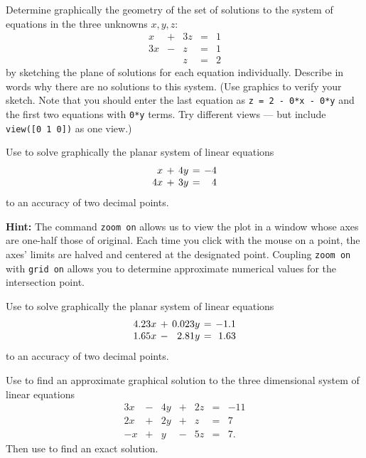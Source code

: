 \documentclass{ximera}
\begin{document}
\CEXER

\begin{exercise} \label{c2.2.10}
Determine graphically the geometry of the set of solutions to the
system of equations in the three unknowns $x,y,z$:
\[
\begin{array}{rcrcr}
  x & + & 3z  & = & 1\\
 3x & - &  z  & = & 1\\
    &   &  z  & = & 2
\end{array}
\]
by sketching the plane of solutions for each equation individually.
Describe in words why there are no solutions to this system.
(Use \Matlab graphics to verify your sketch.  Note that you should
enter the last equation as {\tt z = 2 - 0*x - 0*y} and the first two
equations with {\tt 0*y} terms.  Try different views --- but include
{\tt view([0 1 0])} as one view.)
\end{exercise}

\begin{exercise} \label{c2.2.1}
Use \Matlab to solve graphically the planar system of linear
equations
\[
\arraycolsep 2pt
\begin{array}{rcrcr}
 x & + & 4y & = & -4 \\
4x & + & 3y & = &  4
\end{array}
\]
to an accuracy of two decimal points.

{\bf Hint:} The \Matlab command {\tt zoom on}
allows us to
view the plot in a window whose axes are one-half those of
original.  Each time you click with the mouse on a point,
the axes' limits are halved and centered at the designated
point. Coupling {\tt zoom on} with {\tt grid on} allows you
to determine approximate numerical values for the intersection
point.
\end{exercise}

\begin{exercise} \label{c2.2.2}
Use \Matlab to solve graphically the planar system of linear
equations
\[
\arraycolsep 2pt
\begin{array}{rcrcr}
4.23x & + & 0.023y & = & -1.1 \\
1.65x & - & 2.81y & = &  1.63
\end{array}
\]
to an accuracy of two decimal points.
\end{exercise}


\begin{exercise} \label{c2.2.3}
Use \Matlab to find an approximate graphical solution to the
three dimensional system of linear equations
\[
\begin{array}{rcrcrcr}
 3x & - & 4y & + & 2z  & = & -11\\
 2x & + & 2y & + &  z  & = &   7\\
 -x & + &  y & - & 5z  & = &   7.
\end{array}
\]
Then use \Matlab to find an exact solution.
\end{exercise}
\end{document}
